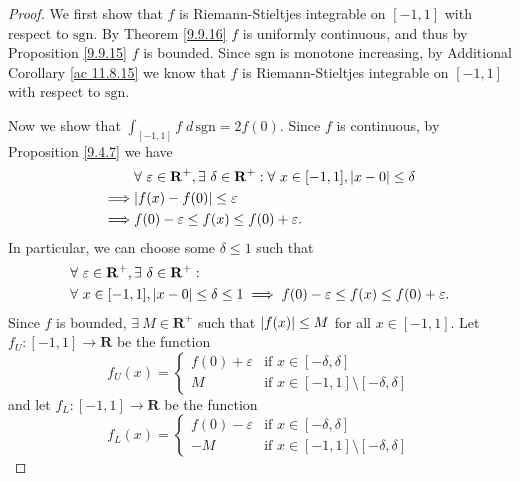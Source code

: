 \begin{proof}
    We first show that \(f\) is Riemann-Stieltjes integrable on \([-1, 1]\) with respect to \(\text{sgn}\).
    By Theorem \ref{9.9.16} \(f\) is uniformly continuous, and thus by Proposition \ref{9.9.15} \(f\) is bounded.
    Since \(\text{sgn}\) is monotone increasing, by Additional Corollary \ref{ac 11.8.15} we know that \(f\) is Riemann-Stieltjes integrable on \([-1, 1]\) with respect to \(\text{sgn}\).

    Now we show that \(\int_{[-1, 1]} f \; d \, \text{sgn} = 2f(0)\).
    Since \(f\) is continuous, by Proposition \ref{9.4.7} we have
    \begin{align*}
                 & \forall\ \varepsilon \in \mathbf{R}^+, \exists\ \delta \in \mathbf{R}^+ : \forall\ x \in [-1, 1], \abs*{x - 0} \leq \delta \\
        \implies & \abs*{f(x) - f(0)} \leq \varepsilon                                                                                        \\
        \implies & f(0) - \varepsilon \leq f(x) \leq f(0) + \varepsilon.
    \end{align*}
    In particular, we can choose some \(\delta \leq 1\) such that
    \begin{align*}
         & \forall\ \varepsilon \in \mathbf{R}^+, \exists\ \delta \in \mathbf{R}^+ :                                              \\
         & \forall\ x \in [-1, 1], \abs*{x - 0} \leq \delta \leq 1 \implies f(0) - \varepsilon \leq f(x) \leq f(0) + \varepsilon.
    \end{align*}
    Since \(f\) is bounded, \(\exists\ M \in \mathbf{R}^+\) such that \(\abs*{f(x)} \leq M\) for all \(x \in [-1, 1]\).
    Let \(f_U : [-1, 1] \to \mathbf{R}\) be the function
    \[
        f_U(x) = \begin{cases}
            f(0) + \varepsilon & \text{if } x \in [-\delta, \delta]                   \\
            M                  & \text{if } x \in [-1, 1] \setminus [-\delta, \delta]
        \end{cases}
    \]
    and let \(f_L : [-1, 1] \to \mathbf{R}\) be the function
    \[
        f_L(x) = \begin{cases}
            f(0) - \varepsilon & \text{if } x \in [-\delta, \delta]                   \\
            -M                 & \text{if } x \in [-1, 1] \setminus [-\delta, \delta]
        \end{cases}
\]
\end{proof}
